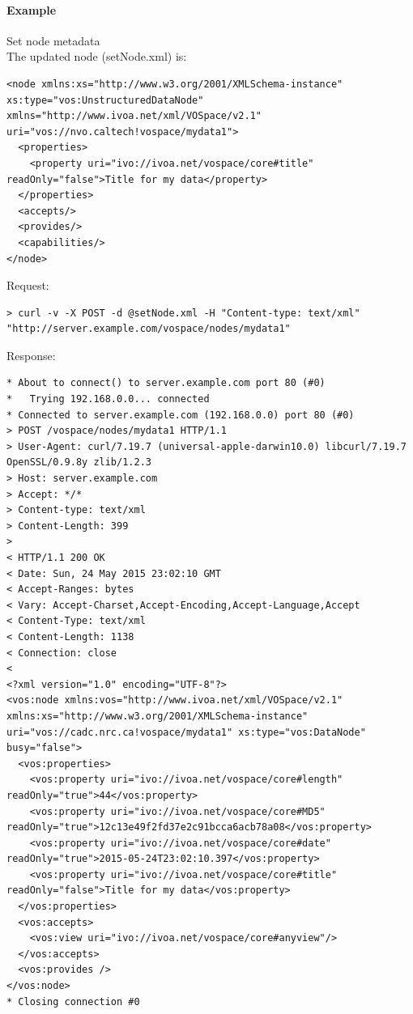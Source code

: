 \documentclass[11pt,a4paper]{ivoa}
\begin{document}
\paragraph{Example}
Set node metadata
\\[5px]
\noindent
The updated node (setNode.xml) is:
\begin{lstlisting}
<node xmlns:xs="http://www.w3.org/2001/XMLSchema-instance" xs:type="vos:UnstructuredDataNode" xmlns="http://www.ivoa.net/xml/VOSpace/v2.1" uri="vos://nvo.caltech!vospace/mydata1">
  <properties>
    <property uri="ivo://ivoa.net/vospace/core#title" readOnly="false">Title for my data</property>
  </properties>
  <accepts/>
  <provides/>
  <capabilities/>
</node>
\end{lstlisting}
Request:
\begin{lstlisting}
> curl -v -X POST -d @setNode.xml -H "Content-type: text/xml" "http://server.example.com/vospace/nodes/mydata1"
\end{lstlisting}
Response:
\begin{lstlisting}
* About to connect() to server.example.com port 80 (#0)
*   Trying 192.168.0.0... connected
* Connected to server.example.com (192.168.0.0) port 80 (#0)
> POST /vospace/nodes/mydata1 HTTP/1.1
> User-Agent: curl/7.19.7 (universal-apple-darwin10.0) libcurl/7.19.7 OpenSSL/0.9.8y zlib/1.2.3
> Host: server.example.com
> Accept: */*
> Content-type: text/xml
> Content-Length: 399
>
< HTTP/1.1 200 OK
< Date: Sun, 24 May 2015 23:02:10 GMT
< Accept-Ranges: bytes
< Vary: Accept-Charset,Accept-Encoding,Accept-Language,Accept
< Content-Type: text/xml
< Content-Length: 1138
< Connection: close
<
<?xml version="1.0" encoding="UTF-8"?>
<vos:node xmlns:vos="http://www.ivoa.net/xml/VOSpace/v2.1" xmlns:xs="http://www.w3.org/2001/XMLSchema-instance" uri="vos://cadc.nrc.ca!vospace/mydata1" xs:type="vos:DataNode" busy="false">
  <vos:properties>
    <vos:property uri="ivo://ivoa.net/vospace/core#length" readOnly="true">44</vos:property>
    <vos:property uri="ivo://ivoa.net/vospace/core#MD5" readOnly="true">12c13e49f2fd37e2c91bcca6acb78a08</vos:property>
    <vos:property uri="ivo://ivoa.net/vospace/core#date" readOnly="true">2015-05-24T23:02:10.397</vos:property>
    <vos:property uri="ivo://ivoa.net/vospace/core#title" readOnly="false">Title for my data</vos:property>
  </vos:properties>
  <vos:accepts>
    <vos:view uri="ivo://ivoa.net/vospace/core#anyview"/>
  </vos:accepts>
  <vos:provides />
</vos:node>
* Closing connection #0
\end{lstlisting}
\end{document}
